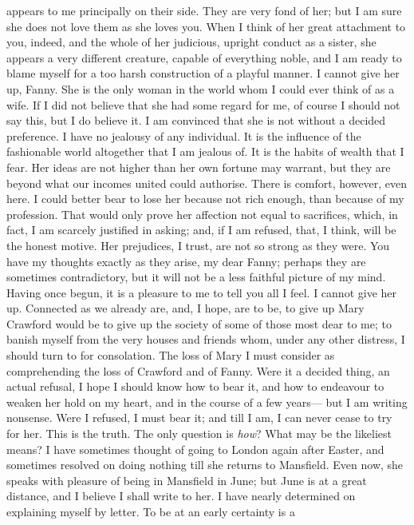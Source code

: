 appears to me principally on their side.  They are very
fond of her; but I am sure she does not love them as she
loves you.  When I think of her great attachment to you,
indeed, and the whole of her judicious, upright conduct
as a sister, she appears a very different creature,
capable of everything noble, and I am ready to blame
myself for a too harsh construction of a playful manner.
I cannot give her up, Fanny.  She is the only woman
in the world whom I could ever think of as a wife.
If I did not believe that she had some regard for me,
of course I should not say this, but I do believe it.
I am convinced that she is not without a decided preference.
I have no jealousy of any individual.  It is the influence
of the fashionable world altogether that I am jealous of.
It is the habits of wealth that I fear.  Her ideas are
not higher than her own fortune may warrant, but they
are beyond what our incomes united could authorise.
There is comfort, however, even here.  I could better
bear to lose her because not rich enough, than because
of my profession.  That would only prove her affection
not equal to sacrifices, which, in fact, I am scarcely
justified in asking; and, if I am refused, that, I think,
will be the honest motive.  Her prejudices, I trust,
are not so strong as they were.  You have my thoughts
exactly as they arise, my dear Fanny; perhaps they are
sometimes contradictory, but it will not be a less faithful
picture of my mind.  Having once begun, it is a pleasure
to me to tell you all I feel.  I cannot give her up.
Connected as we already are, and, I hope, are to be,
to give up Mary Crawford would be to give up the society
of some of those most dear to me; to banish myself from
the very houses and friends whom, under any other distress,
I should turn to for consolation.  The loss of Mary I must
consider as comprehending the loss of Crawford and of Fanny.
Were it a decided thing, an actual refusal, I hope I
should know how to bear it, and how to endeavour to weaken
her hold on my heart, and in the course of a few years---%
but I am writing nonsense.  Were I refused, I must bear it;
and till I am, I can never cease to try for her.
This is the truth.  The only question is \emph{how}?  What may
be the likeliest means?  I have sometimes thought of going
to London again after Easter, and sometimes resolved on
doing nothing till she returns to Mansfield.  Even now,
she speaks with pleasure of being in Mansfield in June;
but June is at a great distance, and I believe I shall
write to her.  I have nearly determined on explaining
myself by letter.  To be at an early certainty is a
